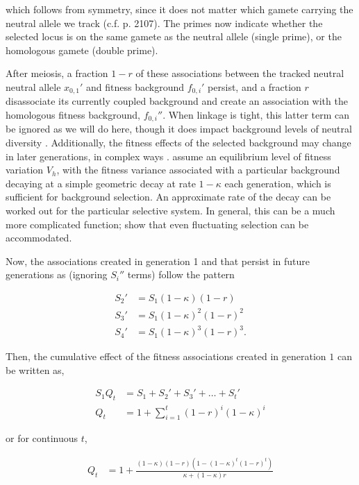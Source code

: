 \documentclass[11pt]{article}
\begin{document}
which follows from symmetry, since it does not matter which gamete carrying the
neutral allele we track (c.f. \cite{Santiago1998-bs} p. 2107). The primes now
indicate whether the selected locus is on the same gamete as the neutral
allele (single prime), or the homologous gamete (double prime).

After meiosis, a fraction $1-r$ of these associations between the tracked
neutral neutral allele $x_{0,1}'$ and fitness background $f_{0,i}'$ persist,
and a fraction $r$ disassociate its currently coupled background and create an
association with the homologous fitness background, $f_{0,i}''$. When linkage
is tight, this latter term can be ignored as we will do here, though it does
impact background levels of neutral diversity \parencite{Santiago1995-hx}.
Additionally, the fitness effects of the selected background may change in
later generations, in complex ways \parencite{Barton1986-yh,Turelli1990-kd}.
\textcite{Santiago1995-hx} assume an equilibrium level of fitness variation
$V_h$, with the fitness variance associated with a particular background
decaying at a simple geometric decay at rate $1-\kappa$ each generation, which
is sufficient for background selection. An approximate rate of the decay can be
worked out for the particular selective system. In general, this can be a much
more complicated function; \textcite{Buffalo2019-qs} show that even fluctuating
selection can be accommodated.

Now, the associations created in generation 1 and that persist in future
generations as (ignoring $S_i''$ terms) follow the pattern

\begin{align}
  S_{2}' &= S_1 (1-\kappa)(1-r) \\
  S_{3}' &= S_1 (1-\kappa)^2(1-r)^2 \\
  S_{4}' &= S_1 (1-\kappa)^3(1-r)^3.
\end{align}

Then, the cumulative effect of the fitness associations created in generation
$1$ can be written as,

\begin{align}
  \label{eq:qterm}
  S_1 Q_t &= S_1 + S_2' + S_3' + \ldots + S_t' \\
  Q_t &= 1 + \sum_{i=1}^t (1-r)^i(1-\kappa)^i
\end{align}

or for continuous $t$, 

\begin{align}
  \label{eq:q_t}
  Q_t &= 1+\frac{(1-\kappa) (1-r) \left(1-(1-\kappa)^t (1-r)^t\right)}{\kappa+(1-\kappa)r}
\end{align}
\end{document}

